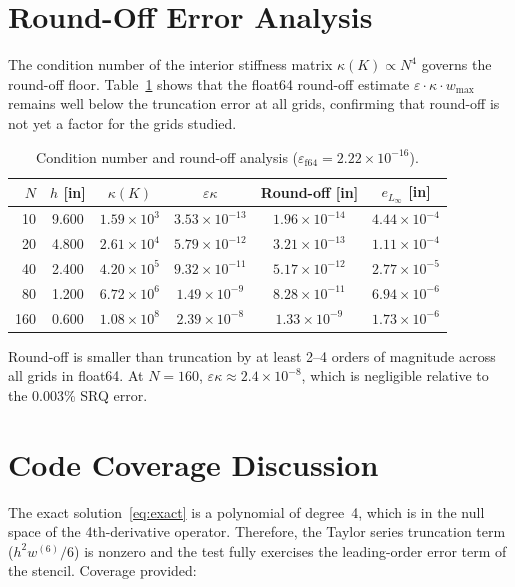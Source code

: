 \documentclass[11pt,letterpaper]{article}
\begin{document}
\section{Round-Off Error Analysis}
\label{sec:roundoff}

The condition number of the interior stiffness matrix $\kappa(K)\propto N^4$
governs the round-off floor.  Table~\ref{tab:roundoff} shows that the float64
round-off estimate $\varepsilon \cdot \kappa \cdot w_{\max}$ remains well below
the truncation error at all grids, confirming that round-off is not yet a factor
for the grids studied.

\begin{table}[ht]
\centering
\caption{Condition number and round-off analysis ($\varepsilon_{\mathrm{f64}}=2.22\times10^{-16}$).}
\label{tab:roundoff}
\small
\begin{tabular}{rccccc}
  \toprule
  $N$ & $h$ [in] & $\kappa(K)$ & $\varepsilon\kappa$ & Round-off [in] & $e_{L_\infty}$ [in] \\
  \midrule
  10  & 9.600 & $1.59\times10^{3}$ & $3.53\times10^{-13}$ & $1.96\times10^{-14}$ & $4.44\times10^{-4}$ \\
  20  & 4.800 & $2.61\times10^{4}$ & $5.79\times10^{-12}$ & $3.21\times10^{-13}$ & $1.11\times10^{-4}$ \\
  40  & 2.400 & $4.20\times10^{5}$ & $9.32\times10^{-11}$ & $5.17\times10^{-12}$ & $2.77\times10^{-5}$ \\
  80  & 1.200 & $6.72\times10^{6}$ & $1.49\times10^{-9}$  & $8.28\times10^{-11}$ & $6.94\times10^{-6}$ \\
  160 & 0.600 & $1.08\times10^{8}$ & $2.39\times10^{-8}$  & $1.33\times10^{-9}$  & $1.73\times10^{-6}$ \\
  \bottomrule
\end{tabular}
\end{table}

Round-off is smaller than truncation by at least 2--4 orders of magnitude across all
grids in float64.  At $N=160$, $\varepsilon\kappa \approx 2.4\times10^{-8}$, which
is negligible relative to the 0.003\% SRQ error.

\section{Code Coverage Discussion}
\label{sec:coverage}

The exact solution~\eqref{eq:exact} is a polynomial of degree~4, which is in the
null space of the 4th-derivative operator.  Therefore, the Taylor series truncation
term ($h^2 w^{(6)}/6$) is nonzero and the test fully exercises the leading-order
error term of the stencil.  Coverage provided:
\end{document}
